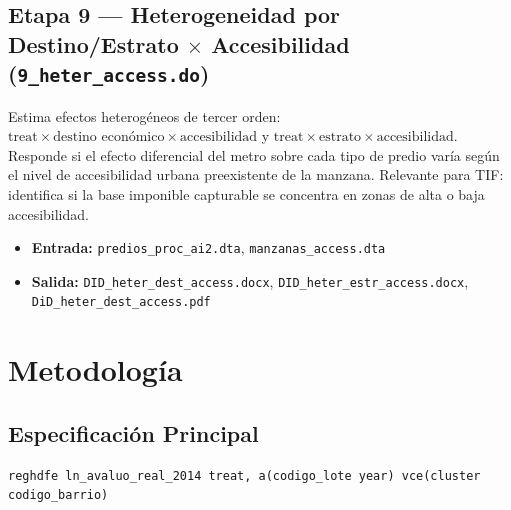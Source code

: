 \documentclass[12pt, a4paper]{article}
\begin{document}
\subsection{Etapa 9 — Heterogeneidad por Destino/Estrato $\times$ Accesibilidad (\texttt{9\_heter\_access.do})}

Estima efectos heterogéneos de tercer orden: $\text{treat} \times \text{destino económico} \times \text{accesibilidad}$ y $\text{treat} \times \text{estrato} \times \text{accesibilidad}$. Responde si el efecto diferencial del metro sobre cada tipo de predio varía según el nivel de accesibilidad urbana preexistente de la manzana. Relevante para TIF: identifica si la base imponible capturable se concentra en zonas de alta o baja accesibilidad.

\begin{itemize}
  \item \textbf{Entrada:} \texttt{predios\_proc\_ai2.dta}, \texttt{manzanas\_access.dta}
  \item \textbf{Salida:} \texttt{DID\_heter\_dest\_access.docx}, \texttt{DID\_heter\_estr\_access.docx}, \texttt{DiD\_heter\_dest\_access.pdf}
\end{itemize}

\section{Metodología}

\subsection{Especificación Principal}

\begin{lstlisting}[language={}]
reghdfe ln_avaluo_real_2014 treat, a(codigo_lote year) vce(cluster codigo_barrio)
\end{lstlisting}
\end{document}
